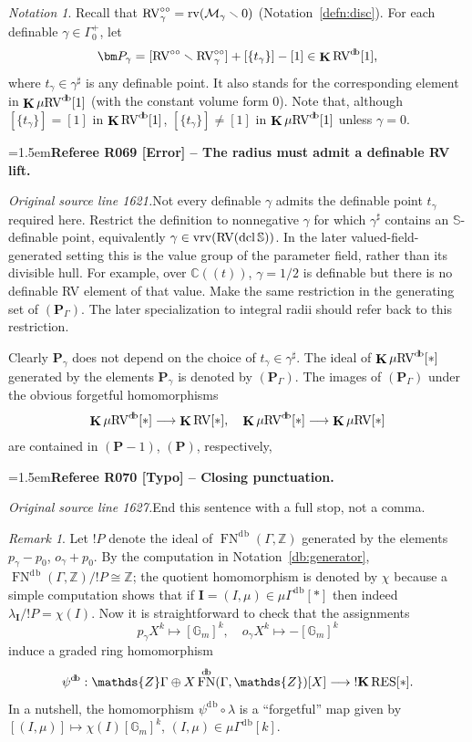 \documentclass[12pt]{amsart}
\newcommand{\RefereeRemark}[4]{%
  \par\medskip\begingroup\normalfont\small\color{RefereePurple}%
  \emergencystretch=1.5em\noindent\textbf{Referee R#1 [#2] -- #3.}\par\nobreak\noindent #4\par
  \endgroup\medskip
}
\theoremstyle{plain}
\theoremstyle{definition}
\theoremstyle{remark}
\newtheorem{rem}[thm]{Remark}
\newtheorem{nota}[thm]{Notation}
\numberwithin{equation}{section}
\theoremstyle{plain}
\newcommand{\RV}{\textup{RV}}
\newcommand{\MM}{\mdl M}
\DeclareMathOperator{\dcl}{dcl}
\newcommand{\Z}{\mathds{Z}}
\newcommand{\G}{\mathds{G}}
\newcommand{\0}{\emptyset}
\newcommand{\mdl}[1]{\mathcal{#1}}  %
\newcommand{\fun}{\longrightarrow}
\newcommand{\efun}{\longmapsto}
\newcommand{\mi}{\smallsetminus}
\newcommand{\mRV}{{\mu}{\RV}}
\newcommand{\mgRV}{{\mu}{\RV}}
\newcommand{\mG}{{\mu}{\Gamma}}
\newcommand{\RES}{\textup{RES}}
\DeclareMathOperator{\rv}{rv}
\DeclareMathOperator{\ggk}{\mathbf{K}}
\DeclareMathOperator{\sggk}{!\mathbf{K}}
\DeclareMathOperator{\fn}{FN}
\DeclareMathOperator{\vrv}{vrv}
\DeclareMathOperator{\db}{d \! b}
\newcommand{\ccirc}{\circ \circ}
\begin{document}
\begin{nota}\label{pgammabis}
Recall that $\RV^{\ccirc}_\gamma = \rv(\MM_{\gamma} \mi 0)$ (Notation~\ref{defn:disc}). For each definable $\gamma \in \Gamma^+_0$, let
\[
\bm P_\gamma = [\RV^{\ccirc} \mi \RV^{\ccirc}_{\gamma}] + [\{t_\gamma\}] - [1] \in \ggk \RV^{\db}[1],
\]
where $t_\gamma \in \gamma^\sharp$ is any definable point.  It also stands for the corresponding element  in $\ggk \mRV^{\db}[1]$ (with the constant volume form $0$). Note that, although $[\{t_\gamma\}] = [1]$ in $\ggk \RV^{\db}[1]$,  $[\{t_\gamma\}] \neq [1]$ in $\ggk \mRV^{\db}[1]$  unless $\gamma = 0$.

\RefereeRemark{069}{Error}{The radius must admit a definable RV lift}{%
\textit{Original source line 1621.}\quad Not every definable $\gamma$ admits the definable point $t_\gamma$ required here. Restrict the definition to nonnegative $\gamma$ for which $\gamma^\sharp$ contains an $\mathbb S$-definable point, equivalently $\gamma\in\vrv(\RV(\dcl\mathbb S))$. In the later valued-field-generated setting this is the value group of the parameter field, rather than its divisible hull. For example, over $\mathbb C((t))$, $\gamma=1/2$ is definable but there is no definable RV element of that value. Make the same restriction in the generating set of $(\bm P_\Gamma)$. The later specialization to integral radii should refer back to this restriction.
}

Clearly  $\bm P_\gamma$ does not depend on the choice of $t_\gamma \in \gamma^\sharp$. The ideal of $\ggk \mRV^{\db}[*]$   generated by the elements $\bm P_\gamma$ is denoted by $(\bm P_\Gamma)$. The images of $(\bm P_\Gamma)$ under the obvious forgetful homomorphisms
\[
\ggk  \mgRV^{\db}[*] \fun \ggk \RV[*], \quad \ggk  \mgRV^{\db}[*] \fun \ggk  \mgRV[*]
\]
are contained in $(\bm P - 1)$, $(\bm P)$, respectively,

\RefereeRemark{070}{Typo}{Closing punctuation}{%
\textit{Original source line 1627.}\quad End this sentence with a full stop, not a comma.
}
\end{nota}

\begin{rem}\label{db:gam:res}
Let $!P$ denote the ideal of $\fn^{\db}(\Gamma, \Z)$ generated by the elements $p_\gamma - p_0$, $o_\gamma + p_0$. By the computation in Notation~\ref{db:generator}, $\fn^{\db}(\Gamma, \Z) / !P \cong \Z$; the quotient homomorphism is denoted by $\chi$ because a simple computation shows that if $\bm I = (I, \mu) \in \mG^{\db}[*]$ then indeed $\lambda_{\bm I} / !P = \chi(I)$. Now it is straightforward to check that the assignments
\begin{equation}\label{Gam:ass:bd}
p_\gamma X^k \efun  [\G_m]^{k}, \quad o_\gamma X^k \efun  - [\G_m]^{k}
\end{equation}
induce a graded ring homomorphism
\[
\psi^{\db} : \Z\Gamma \oplus X\fn^{\db}(\Gamma, \Z)[X] \fun \sggk \RES[*].
\]
In a nutshell, the  homomorphism $\psi^{\db} \circ \lambda$ is a ``forgetful'' map  given by $[(I, \mu)] \efun \chi(I)[\G_m]^{k}$, $(I, \mu) \in \mG^{\db}[k]$.
\end{rem}
\end{document}

